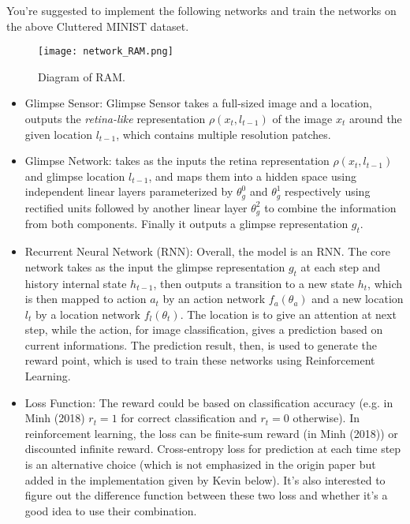 \documentclass[11pt]{article}
\begin{document}
You're suggested to implement the following networks and train the networks on the above Cluttered MINIST dataset.

\begin{figure}[h]
\center
\texttt{[image: network\_RAM.png]}  
\caption{Diagram of RAM.} 
\label{fig:ram}
\end{figure}

\begin{itemize}
	\item Glimpse Sensor: Glimpse Sensor takes a full-sized image and a location, outputs the \emph{retina-like} representation $\rho(x_t,l_{t-1})$ of the image $x_t$ around the given location $l_{t-1}$, which contains multiple resolution patches.
	\item Glimpse Network: takes as the inputs the retina representation $\rho(x_t,l_{t-1})$ and glimpse location $l_{t-1}$, and maps them into a hidden space using independent linear layers parameterized by $\theta_g^0$ and $\theta_g^1$ respectively using rectified units followed by another linear layer $\theta^2_g$ to combine the information from both components. Finally it outputs a glimpse representation $g_t$.
	\item Recurrent Neural Network (RNN): Overall, the model is an RNN. The core network takes as the input the glimpse representation $g_t$ at each step and history internal state $h_{t-1}$, then outputs a transition to a new state $h_{t}$, which is then mapped to action $a_t$ by an action network $f_a(\theta_a)$ and a new location $l_t$ by a location network $f_l(\theta_t)$. The location is to give an attention at next step, while the action, for image classification, gives a prediction based on current informations.  The prediction result, then, is used to generate the reward point, which is used to train these networks using Reinforcement Learning. 
	\item Loss Function: The reward could be based on classification accuracy (e.g. in Minh (2018) $r_t=1$ for correct classification and $r_t=0$ otherwise). In reinforcement learning, the loss can be finite-sum reward (in Minh (2018)) or discounted infinite reward. Cross-entropy loss for prediction at each time step is an alternative choice (which is not emphasized in the origin paper but added in the implementation given by Kevin below). It's also interested to figure out the difference function between these two loss and whether it's a good idea to use their combination. \end{itemize}
\end{document}
